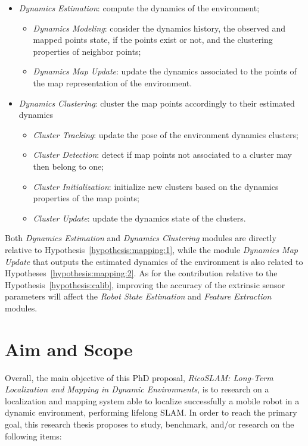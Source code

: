 \begin{itemize}[nosep]
\item \textit{Dynamics Estimation}: compute the dynamics of the environment;
  \begin{itemize}[nosep]
  \item \textit{Dynamics Modeling}: consider the dynamics history, the observed and mapped points state, if the points exist or not, and the clustering properties of neighbor points;
  \item \textit{Dynamics Map Update}: update the dynamics associated to the points of the map representation of the environment.
  \end{itemize}
\item \textit{Dynamics Clustering}: cluster the map points accordingly to their estimated dynamics
  \begin{itemize}[nosep]
  \item \textit{Cluster Tracking}: update the pose of the environment dynamics clusters;
  \item \textit{Cluster Detection}: detect if map points not associated to a cluster may then belong to one;
  \item \textit{Cluster Initialization}: initialize new clusters based on the dynamics properties of the map points;
  \item \textit{Cluster Update}: update the dynamics state of the clusters.
  \end{itemize}
\end{itemize}

Both \textit{Dynamics Estimation} and \textit{Dynamics Clustering} modules are directly relative to Hypothesis~\ref{hypothesis:mapping:1}, while the module \textit{Dynamics Map Update} that outputs the estimated dynamics of the environment is also related to Hypotheses~\ref{hypothesis:mapping:2}.
As for the contribution relative to the Hypothesis~\ref{hypothesis:calib}, improving the accuracy of the extrinsic sensor parameters will affect the \textit{Robot State Estimation} and \textit{Feature Extraction} modules.






\section{Aim and Scope}\label{sec:aim}

Overall, the main objective of this PhD proposal, \textit{RicoSLAM: Long-Term Localization and Mapping in Dynamic Environments}, is to research on a localization and mapping system able to localize successfully a mobile robot in a dynamic environment, performing lifelong \gls{SLAM}.
In order to reach the primary goal, this research thesis proposes to study, benchmark, and/or research on the following items:

